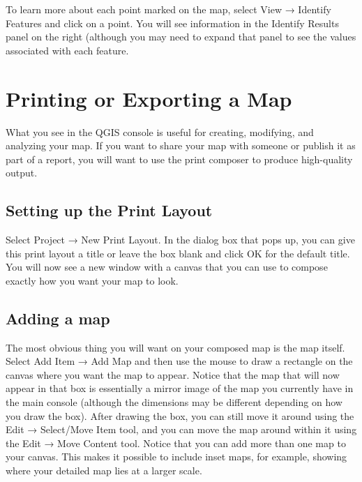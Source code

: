 \documentclass[]{book}
\begin{document}
To learn more about each point marked on the map, select View → Identify Features and click on a point. You will see information in the Identify Results panel on the right (although you may need to expand that panel to see the values associated with each feature.

\hypertarget{printing-or-exporting-a-map}{%
\section{Printing or Exporting a Map}\label{printing-or-exporting-a-map}}

What you see in the QGIS console is useful for creating, modifying, and analyzing your map. If you want to share your map with someone or publish it as part of a report, you will want to use the print composer to produce high-quality output.

\hypertarget{setting-up-the-print-layout}{%
\subsection{Setting up the Print Layout}\label{setting-up-the-print-layout}}

Select Project → New Print Layout. In the dialog box that pops up, you can give this print layout a title or leave the box blank and click OK for the default title. You will now see a new window with a canvas that you can use to compose exactly how you want your map to look.

\hypertarget{adding-a-map}{%
\subsection{Adding a map}\label{adding-a-map}}

The most obvious thing you will want on your composed map is the map itself. Select Add Item → Add Map and then use the mouse to draw a rectangle on the canvas where you want the map to appear. Notice that the map that will now appear in that box is essentially a mirror image of the map you currently have in the main console (although the dimensions may be different depending on how you draw the box). After drawing the box, you can still move it around using the Edit → Select/Move Item tool, and you can move the map around within it using the Edit → Move Content tool. Notice that you can add more than one map to your canvas. This makes it possible to include inset maps, for example, showing where your detailed map lies at a larger scale.
\end{document}
